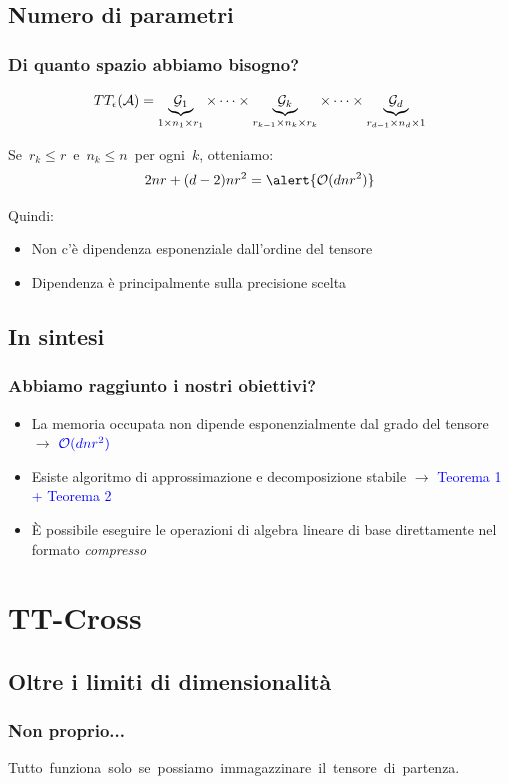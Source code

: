 \documentclass[compress]{beamer}
\theoremstyle{definition}
\theoremstyle{plain}
\begin{document}
\subsection{Numero di parametri}
\begin{frame}
\frametitle{Di quanto spazio abbiamo bisogno?}
\begin{equation*}
	TT_\epsilon(\mathcal{A}) = 
	\underbrace{\mathcal{G}_1}_{1 \times n_1 \times r_1}
	\times \cdots \times
	\underbrace{\mathcal{G}_k}_{r_{k-1} \times n_k \times r_k}
	\times \cdots \times 
	\underbrace{\mathcal{G}_d}_{r_{d-1} \times n_d \times 1}
\end{equation*}	

\vspace{5mm}
Se $\,r_k \leq r\,$ e $\,n_k \leq n\,$ per ogni $\,k$, otteniamo:
\begin{equation*}
	2nr + (d-2)nr^2 = \alert{\mathcal{O}(dnr^2)}
\end{equation*}

Quindi:
\begin{itemize}
	\item Non c'è dipendenza esponenziale dall'ordine del tensore
	\item Dipendenza è principalmente sulla precisione scelta
\end{itemize}
\end{frame}

\subsection{In sintesi}
\begin{frame}
\frametitle{Abbiamo raggiunto i nostri obiettivi?}
\begin{itemize}
\item La memoria occupata non dipende esponenzialmente dal grado del tensore $\rightarrow$ {$\color{blue} \mathcal{O}(dnr^2)$} \color{black}
\item Esiste algoritmo di approssimazione e decomposizione stabile $\rightarrow$ \textcolor{blue}{Teorema 1 + Teorema 2}
\item \`E possibile eseguire le operazioni di algebra lineare di base direttamente nel formato \emph{compresso}
\end{itemize}
\end{frame}

\section{TT-Cross}
\subsection{Oltre i limiti di dimensionalità}
\begin{frame}
\frametitle{Non proprio...}
\pause
\alert{Tutto~funziona~solo~se~possiamo~immagazzinare~il~tensore~di~partenza.}
\end{frame}
\end{document}
